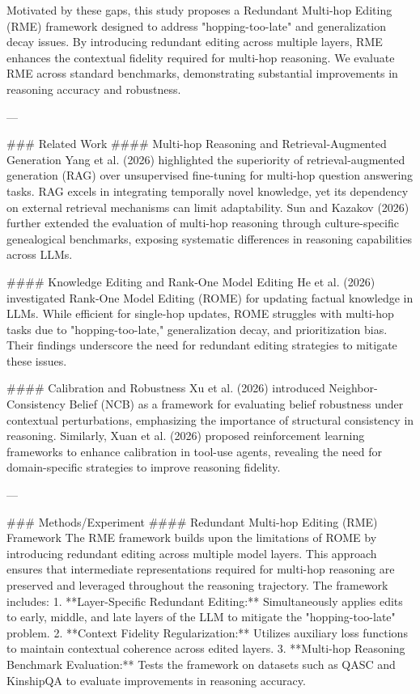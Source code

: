 Motivated by these gaps, this study proposes a Redundant Multi-hop Editing (RME) framework designed to address "hopping-too-late" and generalization decay issues. By introducing redundant editing across multiple layers, RME enhances the contextual fidelity required for multi-hop reasoning. We evaluate RME across standard benchmarks, demonstrating substantial improvements in reasoning accuracy and robustness.

---

### Related Work  
#### Multi-hop Reasoning and Retrieval-Augmented Generation  
Yang et al. (2026) highlighted the superiority of retrieval-augmented generation (RAG) over unsupervised fine-tuning for multi-hop question answering tasks. RAG excels in integrating temporally novel knowledge, yet its dependency on external retrieval mechanisms can limit adaptability. Sun and Kazakov (2026) further extended the evaluation of multi-hop reasoning through culture-specific genealogical benchmarks, exposing systematic differences in reasoning capabilities across LLMs.

#### Knowledge Editing and Rank-One Model Editing  
He et al. (2026) investigated Rank-One Model Editing (ROME) for updating factual knowledge in LLMs. While efficient for single-hop updates, ROME struggles with multi-hop tasks due to "hopping-too-late," generalization decay, and prioritization bias. Their findings underscore the need for redundant editing strategies to mitigate these issues.

#### Calibration and Robustness  
Xu et al. (2026) introduced Neighbor-Consistency Belief (NCB) as a framework for evaluating belief robustness under contextual perturbations, emphasizing the importance of structural consistency in reasoning. Similarly, Xuan et al. (2026) proposed reinforcement learning frameworks to enhance calibration in tool-use agents, revealing the need for domain-specific strategies to improve reasoning fidelity.

---

### Methods/Experiment  
#### Redundant Multi-hop Editing (RME) Framework  
The RME framework builds upon the limitations of ROME by introducing redundant editing across multiple model layers. This approach ensures that intermediate representations required for multi-hop reasoning are preserved and leveraged throughout the reasoning trajectory. The framework includes:  
1. **Layer-Specific Redundant Editing:** Simultaneously applies edits to early, middle, and late layers of the LLM to mitigate the "hopping-too-late" problem.  
2. **Context Fidelity Regularization:** Utilizes auxiliary loss functions to maintain contextual coherence across edited layers.  
3. **Multi-hop Reasoning Benchmark Evaluation:** Tests the framework on datasets such as QASC and KinshipQA to evaluate improvements in reasoning accuracy.

